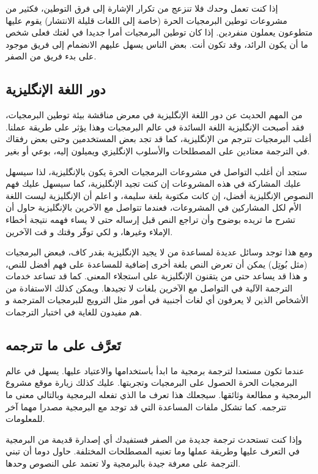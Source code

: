 إذا كنت تعمل وحدك فلا تنزعج من تكرار الإشارة إلى فرق التوطين، فكثير من
مشروعات توطين البرمجيات الحرة (خاصة إلى اللغات قليلة الانتشار) يقوم
عليها متطوعون يعملون منفردين. إذا كان توطين البرمجيات أمرا جديدا في
لغتك فعلى شخص ما أن يكون الرائد، وقد تكون أنت. بعض الناس يسهل عليهم
الانضمام إلى فريق موجود على بدء فريق من الصفر.

\subsection{دور اللغة الإنگليزية}
من المهم الحديث عن دور اللغة الإنگليزية في معرض مناقشة بيئة توطين
البرمجيات، فقد أصبحت الإنگليزية اللغة السائدة في عالم البرمجيات وهذا
يؤثر على طريقة عملنا. أغلب البرمجيات تترجم من الإنگليزية، كما قد تجد
بعض المستخدمين وحتى بعض رفقاك في الترجمة معتادين على المصطلحات والأسلوب
الإنگليزي ويميلون إليه، بوعي أو بغير.

ستجد أن أغلب التواصل في مشروعات البرمجيات الحرة يكون بالإنگليزية، لذا
سيسهل عليك المشاركة في هذه المشروعات إن كنت تجيد الإنگليزية، كما سيسهل
عليك فهم النصوص الإنگليزية أفضل، إن كانت مكتوبة بلغة سليمة، و اعلم أن
الإنگليزية ليست اللغة الأم لكل المشاركين في المشروعات، فعندما تتواصل مع
الآخرين بالإنگليزية حاول أن تشرح ما تريده بوضوح وأن تراجع النص قبل
إرساله حتى لا يساء فهمه نتيجة أخطاء الإملاء وغيرها، و لكي توفّر وقتك و
قت الآخرين.

ومع هذا توجد وسائل عديدة لمساعدة من لا يجيد الإنگليزية بقدر كاف، فبعض
البرمجيات (مثل بُوتِل) يمكن أن تعرض النص بلغة أخرى إضافية للمساعدة على
فهم أفضل للنص، و هذا قد يساعد حتى من يتقنون الإنگليزية على استجلاء
المعنى. كما قد تساعد خدمات الترجمة الآلية في التواصل مع الآخرين بلغات
لا تجيدها. ويمكن كذلك الاستفادة من الأشخاص الذين لا يعرفون أي لغات
أجنبية في أمور مثل الترويج للبرمجيات المترجمة و هم مفيدون للغاية في
اختبار الترجمات.

\subsection{تَعرَّف على ما تترجمه}
عندما تكون مستعدا لترجمة برمجية ما ابدأ باستخدامها والاعتياد عليها. يسهل
في عالم البرمجيات الحرة الحصول على البرمجيات وتجربتها. عليك كذلك زيارة
موقع مشروع البرمجية و مطالعة وثائقها. سيجعلك هذا تعرف ما الذي تفعله
البرمجية وبالتالي معنى ما تترجمه. كما تشكل ملفات المساعدة التي قد توجد
مع البرمجية مصدرا مهما آخر للمعلومات.

وإذا كنت تستحدث ترجمة جديدة من الصفر فستفيدك أي إصدارة قديمة من البرمجية
في التعرف عليها وطريقة عملها وما تعنيه المصطلحات المختلفة. حاول دوما أن
تبني الترجمة على معرفة جيدة بالبرمجية ولا تعتمد على النصوص وحدها.

